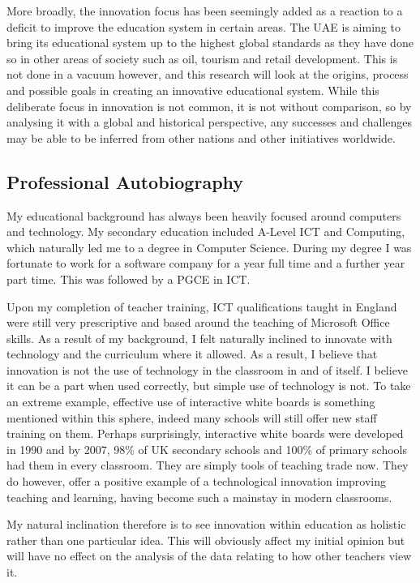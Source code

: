 More broadly, the innovation focus has been seemingly added as a reaction to a deficit to improve the education system in certain areas. The UAE is aiming to bring its educational system up to the highest global standards as they have done so in other areas of society such as oil, tourism and retail development. This is not done in a vacuum however, and this research will look at the origins, process and possible goals in creating an innovative educational system. While this deliberate focus in innovation is not common, it is not without comparison, so by analysing it with a global and historical perspective, any successes and challenges may be able to be inferred from other nations and other initiatives worldwide.


\subsection{Professional Autobiography}
My educational background has always been heavily focused around computers and technology. My secondary education included
A-Level ICT and Computing, which naturally led me to a degree in Computer Science. During my degree I was fortunate to work for a software company for a year full time and a further year part time. This was followed by a PGCE in ICT.

Upon my completion of teacher training, ICT qualifications taught in England were still very prescriptive and based around the teaching of Microsoft Office skills. As a result of my background, I felt naturally inclined to innovate with technology and the curriculum where it allowed. As a result, I believe that innovation is not the use of technology in the classroom in and of itself. I believe it can be a part when used correctly, but simple use of technology is not. To take an extreme example, effective use of interactive white boards is something mentioned within this sphere, indeed many schools will still offer new staff training on them. Perhaps surprisingly, interactive white boards were developed in 1990 and by 2007, 98\%  of UK secondary schools and 100\% of primary schools had them in every classroom. \cite[p.35]{kitchen2008harnessing} They are simply tools of teaching trade now. They do however, offer a positive example of a technological innovation improving teaching and learning, having become such a mainstay in modern classrooms.

My natural inclination therefore is to see innovation within education as holistic rather than one particular idea. This will obviously affect my initial opinion but will have no effect on the analysis of the data relating to how other teachers view it.

